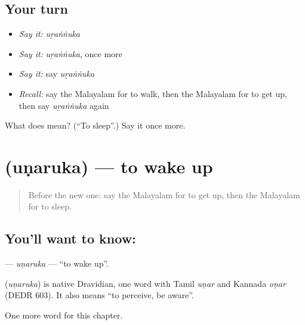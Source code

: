 \subsection*{Your turn}
\begin{itemize}
\raggedright
  \item \emph{Say it:} \emph{uṟaṅṅuka}
  \item \emph{Say it:} \emph{uṟaṅṅuka}, once more
  \item \emph{Say it:} say \emph{uṟaṅṅuka}
  \item \emph{Recall:} say the Malayalam for to walk, then the Malayalam for to get up, then say \emph{uṟaṅṅuka} again
\end{itemize}

\begin{tcolorbox}[breakable,colback=teal!4,colframe=teal!35!black,title={Before you move on}]
What does  mean? (\textquotedblleft{}To sleep\textquotedblright{}.) Say it once more.
\end{tcolorbox}
\section[\texorpdfstring{\ml{ഉണരുക} (uṇaruka)}{ഉണരുക (uṇaruka)}]{ (uṇaruka) — to wake up}

\label{lesson:ML-C171-unaruka}



\begin{quote}
Before the new one: say the Malayalam for to get up, then the Malayalam for to sleep.
\end{quote}

\subsection*{You'll want to know: }
\textbf{} — \emph{uṇaruka} — \textquotedblleft{}to wake up\textquotedblright{}.

\begin{cousinweb}
\textbf{} (\emph{uṇaruka}) is native Dravidian, one word with Tamil \emph{uṇar} and Kannada \emph{oṇar} (DEDR 603). It also means \textquotedblleft{}to perceive, be aware\textquotedblright{}.
\end{cousinweb}

\begin{grammarlens}[title={What you've built}]
One more word for this chapter.
\end{grammarlens}

